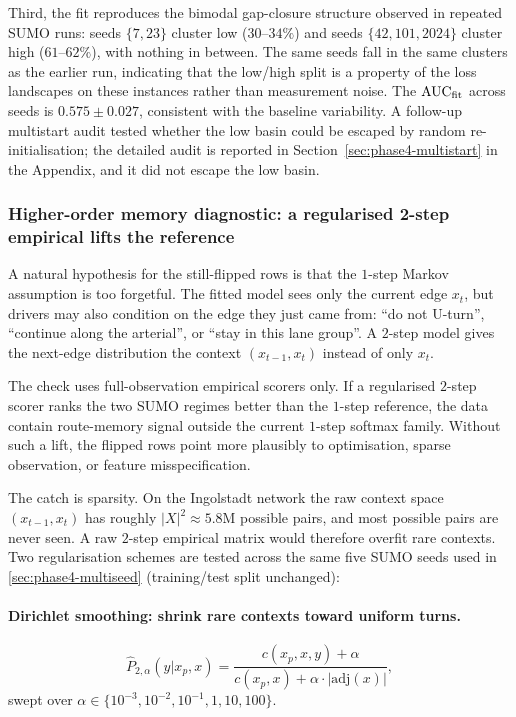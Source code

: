 Third, the  fit reproduces the bimodal gap-closure
structure observed in repeated SUMO runs: seeds $\{7, 23\}$ cluster
low ($30$--$34\%$) and seeds $\{42, 101, 2024\}$ cluster high
($61$--$62\%$), with nothing in between. The same seeds fall in the same
clusters as the earlier run, indicating that the low/high split is a
property of the loss landscapes on these instances rather than measurement
noise. The  $\mathrm{AUC}_{\mathrm{fit}}$ across seeds is
$0.575 \pm 0.027$, consistent with the baseline variability. A follow-up
multistart audit tested whether the low basin could be escaped by random
re-initialisation; the detailed audit is reported in
Section~\ref{sec:phase4-multistart} in the Appendix, and it did not escape
the low basin.

\subsubsection{Higher-order memory diagnostic: a regularised 2-step
empirical lifts the reference}
\label{sec:phase4-2step}

A natural hypothesis for the still-flipped rows is that the $1$-step
Markov assumption is too forgetful. The fitted model sees only the current
edge $x_t$, but drivers may also condition on the edge they just came from:
``do not U-turn'', ``continue along the arterial'', or ``stay in this
lane group''. A $2$-step model gives the next-edge distribution the context
$(x_{t-1},x_t)$ instead of only $x_t$.

The check uses full-observation empirical scorers only. If a regularised
$2$-step scorer ranks the two SUMO regimes better than the $1$-step
reference, the data contain route-memory signal outside the current
$1$-step softmax family. Without such a lift, the flipped rows point more
plausibly to optimisation, sparse observation, or feature misspecification.

The catch is sparsity. On the Ingolstadt network the raw context space
$(x_{t-1},x_t)$ has roughly $|X|^2 \approx 5.8$M possible pairs, and most
possible pairs are never seen. A raw $2$-step empirical matrix would
therefore overfit rare contexts. Two regularisation schemes are tested
across the same five SUMO seeds used in \cref{sec:phase4-multiseed}
(training/test split unchanged):

\paragraph{Dirichlet smoothing: shrink rare contexts toward uniform turns.}
\[
\widehat{P}_{2,\alpha}(y | x_p, x) =
\frac{c(x_p, x, y) + \alpha}
{c(x_p, x) + \alpha \cdot |\mathrm{adj}(x)|},
\]
swept over $\alpha \in \{10^{-3}, 10^{-2}, 10^{-1}, 1, 10, 100\}$.

